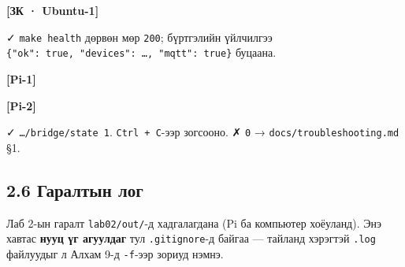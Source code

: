 \textbf{{[}ЗК · Ubuntu-1{]}}

\begin{Shaded}
\begin{Highlighting}[]
\KeywordTok{\&\&} \KeywordTok{\&\&} 
\KeywordTok{|} 
\end{Highlighting}
\end{Shaded}

✓ \texttt{make\ health} дөрвөн мөр \texttt{200}; бүртгэлийн үйлчилгээ \texttt{\{"ok":\allowbreak{}\ true,\ "devices":\allowbreak{}\ \ldots{},\ "mqtt":\allowbreak{}\ true\}} буцаана.

\textbf{{[}Pi-1{]}}

\begin{Shaded}
\begin{Highlighting}[]
\KeywordTok{\&\&} 
\end{Highlighting}
\end{Shaded}

\textbf{{[}Pi-2{]}}

\begin{Shaded}
\begin{Highlighting}[]
\KeywordTok{\&\&} 
\end{Highlighting}
\end{Shaded}

✓ \texttt{\ldots{}/\allowbreak{}bridge/\allowbreak{}state\ 1}. \texttt{Ctrl\ +\ C}-ээр зогсооно. ✗ \texttt{0} → \texttt{docs/\allowbreak{}troubleshooting.\allowbreak{}md} §1.

\hypertarget{ux433ux430ux440ux430ux43bux442ux44bux43d-ux43bux43eux433}{%
\subsection{2.6 Гаралтын лог}\label{ux433ux430ux440ux430ux43bux442ux44bux43d-ux43bux43eux433}}

Лаб 2-ын гаралт \texttt{lab02/out/}-д хадгалагдана (Pi ба компьютер хоёуланд). Энэ хавтас \textbf{нууц үг агуулдаг} тул \texttt{.gitignore}-д байгаа --- тайланд хэрэгтэй \texttt{.log} файлуудыг л Алхам 9-д \texttt{-f}-ээр зориуд нэмнэ.

